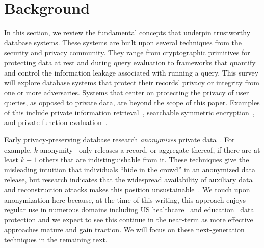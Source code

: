 \documentclass[11pt]{article}
\begin{document}
\section{Background}
\label{sec:background}



In this section, we review the fundamental concepts that underpin trustworthy database systems.  These systems are built upon several techniques from the security and privacy community.  They range from cryptographic primitives for protecting data at rest and during query evaluation to frameworks that quantify and control the information leakage associated with running a query.  %
This survey will explore database systems that protect their records' privacy or integrity from one or more adversaries.  Systems that center on protecting the privacy of user queries, as opposed to private data, are beyond the scope of this paper.  Examples of this include private information retrieval~\cite{chor1998private, olumofin2010privacy}, searchable symmetric encryption~\cite{hacigumucs2002executing}, and private function evaluation~\cite{wang2017splinter}. %





Early privacy-preserving database research  {\em anonymizes} private data~\cite{lefevre2005incognito, nergiz2008multirelational,machanavajjhala2007diversity,li2006t}.   For example, $k$-anonymity~\cite{sweeney2002k}  only releases a record, or aggregate thereof, if there are at least $k-1$ others  that are indistinguishable from it.   These techniques give the misleading intuition that individuals   ``hide in the crowd'' in an anonymized data release, but research indicates that the widespread availability of auxiliary data and reconstruction attacks makes this position unsustainable~\cite{narayanan2014no, ohm2009broken, rocher2019estimating}.  We touch upon anonymization here because, at the time of this writing, this approach enjoys regular use in numerous domains including US healthcare~\cite{office2002standards} and education~\cite{chicaiza2020application, seastrom2017best} data protection and we expect to see this continue in the near-term as more effective approaches mature and gain traction.   We will focus on these next-generation techniques in the remaining text.
\end{document}
